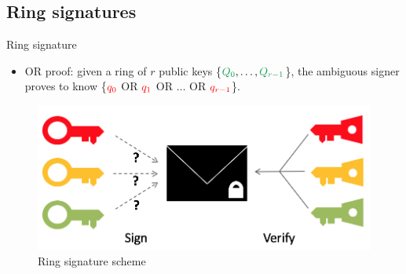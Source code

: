\documentclass[usenames,dvipsnames]{beamer}
\begin{document}
    \subsection{Ring signatures}
    \begin{frame}{Ring signature}
        \begin{itemize}%
            \item OR proof: given a ring of $r$ public keys \{$\color{ForestGreen}Q_0\color{black}, \dots, \color{ForestGreen}Q_{r-1}$\color{black}\}, the ambiguous signer proves to know \{$\color{red}q_0$ \color{black}OR $\color{red}q_1$ \color{black}OR $\dots$ \color{black}OR $\color{red}q_{r-1}$\color{black}\}.
        \end{itemize}
        \begin{figure}
            \centering
            \includegraphics[scale = 0.5]{Images/Ring.png}
            \caption{Ring signature scheme}
        \end{figure}
        \begin{itemize}

\end{itemize}
\end{frame}
\end{document}

